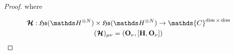\documentclass{homework}
\begin{document}
\begin{proof}
where 

\begin{align*}
    \bm{\mathcal{H}} : \mathfrak{H}\mathfrak{s}(\hilbert^{\otimes N}) & \times \mathfrak{H}\mathfrak{s}(\hilbert^{\otimes N}) \rightarrow \mathds{C}^{\dim \times \dim} \\
    & (\bm{\mathcal{H}})_{\mu \nu} = ({\bf O}_{\nu}, [{\bf H}, {\bf O}_{\nu}])
\end{align*}
    
\end{proof}
\end{document}
